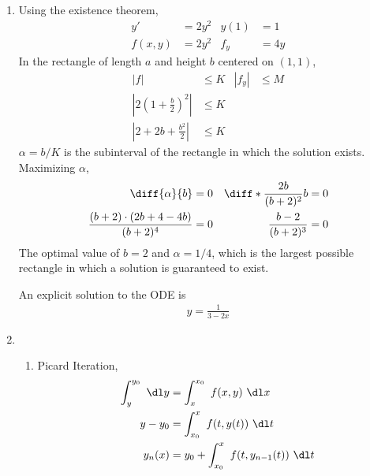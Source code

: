 \begin{enumerate}
    \item Using the existence theorem,
          \begin{align}
              y'      & = 2y^{2} & y(1)  & = 1  \\
              f(x, y) & = 2y^{2} & f_{y} & = 4y
          \end{align}
          In the rectangle of length $ a $ and height $ b $ centered on $ (1, 1) $,
          \begin{align}
              |f|                                     & \leq K & |f_{y}| & \leq M \\
              \left| 2\left( 1 + \frac{b}{2} \right)^{2}
              \right|                                 & \leq K                    \\
              \left| 2 + 2b + \frac{b^{2}}{2} \right| & \leq K
          \end{align}
          $ \alpha = b/K$ is the subinterval of the rectangle in which the solution
          exists. Maximizing $ \alpha $,
          \begin{align}
              \diff{\alpha}{b}                        & = 0 &
              \diff*{\frac{2b}{(b+2)^{2}}}{b}         & = 0   \\
              \frac{(b+2) \cdot (2b+4-4b)}{(b+2)^{4}} & = 0 &
              \frac{b-2}{(b+2)^{3}}                   & = 0
          \end{align}
          The optimal value of $ b = 2 $ and $ \alpha = 1/4 $, which is the largest
          possible rectangle in which a solution is guaranteed to exist. \par
          An explicit solution to the ODE is
          \begin{align}
              y = \frac{1}{3 - 2x}
          \end{align}

    \item \begin{enumerate}
              \item Picard Iteration,
                    \begin{align}
                        \int_{y}^{y_{0}}\  \dl y & = \int_{x}^{x_{0}}\ f(x, y)
                        \ \dl x                                                   \\
                        y - y_{0}                & = \int_{x_{0}}^{x}\ f(t, y(t))
                        \ \dl t                                                   \\
                        y_{n}(x)                 & = y_{0} + \int_{x_{0}}^{x}
                        \ f(t, y_{n-1}(t))\ \dl t
                    \end{align}


\end{enumerate}
\end{enumerate}
